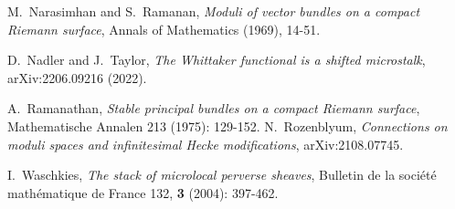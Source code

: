 \documentclass[9pt]{amsart}
\theoremstyle{remark}
\theoremstyle{definition}
\theoremstyle{remark}
\numberwithin{equation}{section}
\begin{document}
\begin{thebibliography}{99}
 
 M.~Narasimhan and S.~Ramanan, 
{\it Moduli of vector bundles on a compact Riemann surface},
Annals of Mathematics (1969), 14-51.
 
 D.~Nadler and J.~Taylor, {\it The Whittaker functional is a shifted microstalk},
arXiv:2206.09216 (2022).
%
%
%
%

 A.~Ramanathan, {\it Stable principal bundles on a compact Riemann surface}, Mathematische Annalen 213 (1975): 129-152.
%
 N.~Rozenblyum, {\it Connections on moduli spaces and infinitesimal Hecke modifications}, arXiv:2108.07745. 
%

 I.~Waschkies, {\it The stack of microlocal perverse sheaves}, 
Bulletin de la société mathématique de France 132, {\bf{3}} (2004): 397-462.


\end{thebibliography}
\end{document}
